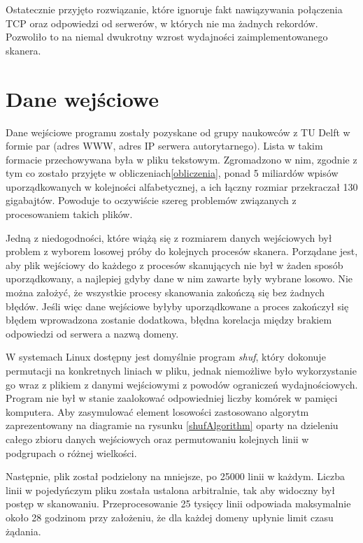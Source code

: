 Ostatecznie przyjęto rozwiązanie, które ignoruje fakt nawiązywania połączenia TCP oraz odpowiedzi od serwerów, w których nie ma żadnych rekordów. Pozwoliło to na niemal dwukrotny wzrost wydajności zaimplementowanego skanera.

\section{Dane wejściowe}
Dane wejściowe programu zostały pozyskane od grupy naukowców z TU Delft\cite{delft} w formie par (adres WWW, adres IP serwera autorytarnego). Lista w takim formacie przechowywana była w pliku tekstowym. Zgromadzono w nim, zgodnie z tym co zostało przyjęte w obliczeniach\ref{obliczenia}, ponad 5 miliardów wpisów uporządkowanych w kolejności alfabetycznej, a ich łączny rozmiar przekraczał 130 gigabajtów. Powoduje to oczywiście szereg problemów związanych z procesowaniem takich plików. 

Jedną z niedogodności, które wiążą się z rozmiarem danych wejściowych był problem z wyborem losowej próby do kolejnych procesów skanera. Porządane jest, aby plik wejściowy do każdego z procesów skanujących nie był w żaden sposób uporządkowany, a najlepiej gdyby dane w nim zawarte były wybrane losowo. Nie można założyć, że wszystkie procesy skanowania zakończą się bez żadnych błędów. Jeśli więc dane wejściowe byłyby uporządkowane a proces zakończył się błędem wprowadzona zostanie dodatkowa, błędna korelacja między brakiem odpowiedzi od serwera a nazwą domeny.

W systemach Linux dostępny jest domyślnie program \textit{shuf}\cite{shuf}, który dokonuje permutacji na konkretnych liniach w pliku, jednak niemożliwe było wykorzystanie go wraz z plikiem z danymi wejściowymi z powodów ograniczeń wydajnościowych. Program nie był w stanie zaalokować odpowiedniej liczby komórek w pamięci komputera. Aby zasymulować element losowości zastosowano algorytm zaprezentowany na diagramie na rysunku \ref{shufAlgorithm} oparty na dzieleniu całego zbioru danych wejściowych oraz permutowaniu kolejnych linii w podgrupach o różnej wielkości.

Następnie, plik został podzielony na mniejsze, po 25000 linii w każdym. Liczba linii w pojedyńczym pliku została ustalona arbitralnie, tak aby widoczny był postęp w skanowaniu. Przeprocesowanie 25 tysięcy linii odpowiada maksymalnie około 28 godzinom przy założeniu, że dla każdej domeny upłynie limit czasu żądania.